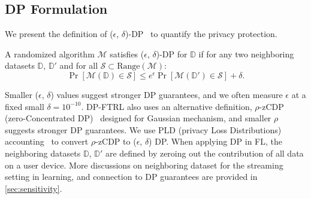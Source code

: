 \subsection{DP Formulation} \label{subsec:dp_def}
We present the definition of ($\epsilon$, $\delta$)-DP~\citep{dwork2006calibrating,dwork2014algorithmic} to quantify the privacy protection. 
\begin{definition}
  A randomized algorithm $\mathcal{M}$ satisfies  ($\epsilon$, $\delta$)-DP for $\mathbb{D}$ if for any two neighboring datasets $\mathbb{D}$, $\mathbb{D}'$ and for all $\mathcal{S}\subset \text{Range}(\mathcal{M})$: 
\[
\textstyle{\Pr[\mathcal{M}(\mathbb{D}) \in \mathcal{S}] \leq e^{\epsilon}\Pr[\mathcal{M}(\mathbb{D}') \in \mathcal{S}] +\delta}
.\]
\end{definition}
Smaller ($\epsilon$, $\delta$) values suggest stronger DP guarantees, and we often measure $\epsilon$ at a fixed small $\delta=10^{-10}$. DP-FTRL also uses an alternative definition, $\rho$-zCDP (zero-Concentrated DP)~\citep{bun2016concentrated} designed for Gaussian mechanism, and smaller $\rho$ suggests stronger DP guarantees. We use PLD (privacy Loss Distributions) accounting~\citep{doroshenko2022connect,pldlib} to convert $\rho$-zCDP to ($\epsilon$, $\delta$) DP. When applying DP in FL, the neighboring datasets $\mathbb{D}$, $\mathbb{D}'$ are defined by zeroing out the contribution of all data on a user device. More discussions on neighboring dataset for the streaming setting in learning, and connection to DP guarantees are provided in \cref{sec:sensitivity}.